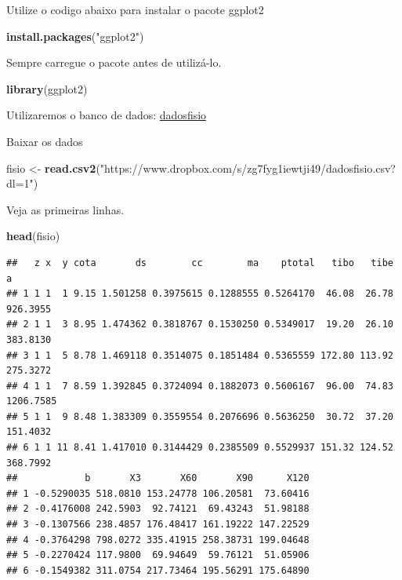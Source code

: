 \documentclass[
]{book}
\newenvironment{Shaded}{\begin{snugshade}}{\end{snugshade}}
\newcommand{\KeywordTok}[1]{\textcolor[rgb]{0.13,0.29,0.53}{\textbf{#1}}}
\newcommand{\NormalTok}[1]{#1}
\newcommand{\StringTok}[1]{\textcolor[rgb]{0.31,0.60,0.02}{#1}}
\begin{document}
Utilize o codigo abaixo para instalar o pacote ggplot2

\begin{Shaded}
\begin{Highlighting}[]
\KeywordTok{install.packages}\NormalTok{(}\StringTok{"ggplot2"}\NormalTok{)}
\end{Highlighting}
\end{Shaded}

Sempre carregue o pacote antes de utilizá-lo.

\begin{Shaded}
\begin{Highlighting}[]
\KeywordTok{library}\NormalTok{(ggplot2)}
\end{Highlighting}
\end{Shaded}

Utilizaremos o banco de dados:
\href{https://www.dropbox.com/s/zg7fyg1iewtji49/dadosfisio.csv?dl=1}{dadosfisio}

Baixar os dados

\begin{Shaded}
\begin{Highlighting}[]
\NormalTok{fisio <-}\StringTok{ }\KeywordTok{read.csv2}\NormalTok{(}\StringTok{"https://www.dropbox.com/s/zg7fyg1iewtji49/dadosfisio.csv?dl=1"}\NormalTok{)}
\end{Highlighting}
\end{Shaded}

Veja as primeiras linhas.

\begin{Shaded}
\begin{Highlighting}[]
\KeywordTok{head}\NormalTok{(fisio)}
\end{Highlighting}
\end{Shaded}

\begin{verbatim}
##   z x  y cota       ds        cc        ma    ptotal   tibo   tibe         a
## 1 1 1  1 9.15 1.501258 0.3975615 0.1288555 0.5264170  46.08  26.78  926.3955
## 2 1 1  3 8.95 1.474362 0.3818767 0.1530250 0.5349017  19.20  26.10  383.8130
## 3 1 1  5 8.78 1.469118 0.3514075 0.1851484 0.5365559 172.80 113.92  275.3272
## 4 1 1  7 8.59 1.392845 0.3724094 0.1882073 0.5606167  96.00  74.83 1206.7585
## 5 1 1  9 8.48 1.383309 0.3559554 0.2076696 0.5636250  30.72  37.20  151.4032
## 6 1 1 11 8.41 1.417010 0.3144429 0.2385509 0.5529937 151.32 124.52  368.7992
##            b       X3       X60       X90      X120
## 1 -0.5290035 518.0810 153.24778 106.20581  73.60416
## 2 -0.4176008 242.5903  92.74121  69.43243  51.98188
## 3 -0.1307566 238.4857 176.48417 161.19222 147.22529
## 4 -0.3764298 798.0272 335.41915 258.38731 199.04648
## 5 -0.2270424 117.9800  69.94649  59.76121  51.05906
## 6 -0.1549382 311.0754 217.73464 195.56291 175.64890
\end{verbatim}
\end{document}
